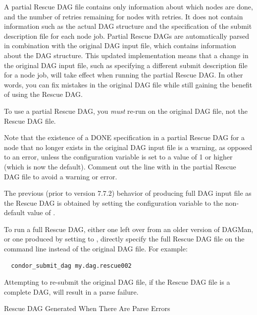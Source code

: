 A partial Rescue DAG file contains only information about which nodes are done,
and the number of retries remaining for nodes with retries.  
It does not contain information such as the actual
DAG structure and the specification of the submit description file 
for each node job.  
Partial Rescue DAGs are automatically parsed in combination with
the original DAG input file, 
which contains information about the DAG structure.  
This updated implementation means that a change in the original DAG input file,
such as specifying a different submit description file for a node job,
will take effect when running the partial Rescue DAG.
In other words, you can fix mistakes in the original DAG file while
still gaining the benefit of using the Rescue DAG.

To use a partial Rescue DAG, you \emph{must} re-run 
on the original DAG file, not the Rescue DAG file.

Note that the existence of a DONE specification in a partial Rescue DAG for
a node that no longer exists in the original DAG input file
is a warning, as opposed to an error, 
unless the  configuration
variable is set to a value of 1 or higher (which is now the default).  
Comment out the line with  in the partial Rescue DAG file
to avoid a warning or error.

The previous (prior to version 7.7.2) behavior of producing full DAG input file 
as the Rescue DAG 
is obtained by setting the configuration variable
 to the non-default 
value of .  

To run a full Rescue DAG,
either one left over from an older version of DAGMan, 
or one produced by setting  
to , 
directly specify the full Rescue DAG file on the command line
instead of the original DAG file.
For example:

\begin{verbatim}
  condor_submit_dag my.dag.rescue002
\end{verbatim}

Attempting to re-submit the original DAG file, if the Rescue DAG file
is a complete DAG, will result in a parse failure.


\label{dagman:rescue_parse_error}
\begin{description}
\item[Rescue DAG Generated When There Are Parse Errors]
\end{description}

